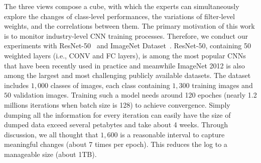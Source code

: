 \documentclass[format=acmsmall, review=false, screen=true]{acmart}
\newcommand{\ti}{\textcolor[rgb]{0,0,0}}
\newcommand{\dy}{\textcolor[rgb]{0,0,0}}
\begin{document}
\ti{
The three views compose a cube, with which the experts can simultaneously explore the changes of class-level performances, the variations of filter-level weights, and the correlations between them.
}%
The primary motivation of this work is to monitor industry-level CNN training processes. Therefore, we conduct our experiments with ResNet-50~\cite{he2016deep} and ImageNet Dataset~\cite{russakovsky2015imagenet}.
ResNet-50, containing 50 weighted layers (i.e., CONV and FC layers), is among the most popular CNNs that have been recently used in practice and meanwhile ImageNet 2012 is also among the largest and most challenging publicly available datasets.
The dataset includes $1,000$ classes of images, each class containing $1,300$ training images and $50$ validation images.
Training such a model needs around 120 epoches (nearly 1.2 millions iterations when batch size is 128) to achieve convergence.
Simply dumping all the information for every iteration can easily have the size of dumped data exceed several petabytes and take about 4 weeks. Through discussion, we all thought that $1,600$ is a reasonable interval to capture meaningful changes (about 7 times per epoch). This reduces the log to a manageable size (about 1TB).
\end{document}
